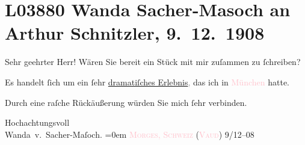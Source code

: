 

\section[Wanda Sacher-Masoch an Arthur Schnitzler, 9. 12. 1908]{L03880 Wanda Sacher-Masoch an Arthur Schnitzler, 9. 12. 1908}
\nopagebreak{}
\rehead{ }\normalsize\beginnumbering{}
\toendnotes[C]{\smallbreak\pagebreak[2]}
\pstart{}{\pb}Sehr geehrter Herr!\pend\vspace{0.5em}
\pstart
           Wären Sie bereit ein Stück mit mir zuſammen zu ſchreiben?\pend
           
\pstart
           Es handelt ſich um ein ſehr \uline{dramatiſches
                  Erlebnis}\textcolor{gray}{,} das ich in \textcolor{pink}{München}\ledrightnote{\textcolor{pink}{München}} hatte.\pend
           
\pstart
           {\pb}Durch eine raſche Rückäußerung würden Sie mich ſehr
               verbinden.\pend
           
\pstart
           Hochachtungsvoll{\\[\baselineskip]}\spacefill\mbox{Wanda v. Sacher-Maſoch.}\pend
           \leftskip=0em{}
\pstart
           \textsc{\textcolor{pink}{Morges, Schweiz}\ledrightnote{\textcolor{pink}{Morges}}
                        (\textcolor{pink}{Vaud}\ledrightnote{\textcolor{pink}{Kanton Waadt}})}{ }9/12–08\pend
           \endnumbering{}
\begin{anhang}
\end{anhang}
      